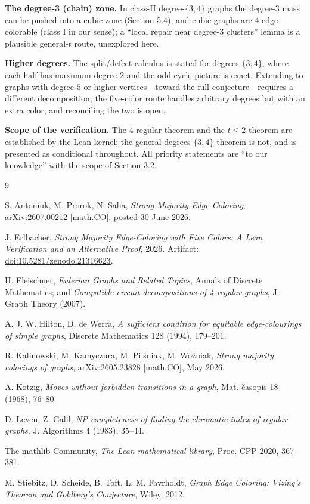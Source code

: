 \documentclass[11pt]{article}
\theoremstyle{definition}
\theoremstyle{remark}
\begin{document}
\textbf{The degree-3 (chain) zone.} In class-II degree-$\{3,4\}$ graphs the degree-3 mass can be pushed into a cubic zone (Section 5.4), and cubic graphs are 4-edge-colorable (class I in our sense); a ``local repair near degree-3 clusters'' lemma is a plausible general-$t$ route, unexplored here.

\textbf{Higher degrees.} The split/defect calculus is stated for degrees $\{3,4\}$, where each half has maximum degree $2$ and the odd-cycle picture is exact. Extending to graphs with degree-$5$ or higher vertices---toward the full conjecture---requires a different decomposition; the five-color route \cite{E5} handles arbitrary degrees but with an extra color, and reconciling the two is open.

\textbf{Scope of the verification.} The 4-regular theorem and the $t \le 2$ theorem are established by the Lean kernel; the general degrees-$\{3,4\}$ theorem is not, and is presented as conditional throughout. All priority statements are ``to our knowledge'' with the scope of Section 3.2.

\begin{thebibliography}{9}

S. Antoniuk, M. Prorok, N. Salia, \emph{Strong Majority Edge-Coloring}, arXiv:2607.00212 [math.CO], posted 30 June 2026.

J. Erlbacher, \emph{Strong Majority Edge-Coloring with Five Colors: A Lean Verification and an Alternative Proof}, 2026. Artifact: \href{https://doi.org/10.5281/zenodo.21316623}{doi:10.5281/zenodo.21316623}.

H. Fleischner, \emph{Eulerian Graphs and Related Topics}, Annals of Discrete Mathematics; and \emph{Compatible circuit decompositions of 4-regular graphs}, J. Graph Theory (2007).

A. J. W. Hilton, D. de Werra, \emph{A sufficient condition for equitable edge-colourings of simple graphs}, Discrete Mathematics 128 (1994), 179--201.

R. Kalinowski, M. Kamyczura, M. Pilśniak, M. Woźniak, \emph{Strong majority colorings of graphs}, arXiv:2605.23828 [math.CO], May 2026.

A. Kotzig, \emph{Moves without forbidden transitions in a graph}, Mat. časopis 18 (1968), 76--80.

D. Leven, Z. Galil, \emph{NP completeness of finding the chromatic index of regular graphs}, J. Algorithms 4 (1983), 35--44.

The mathlib Community, \emph{The Lean mathematical library}, Proc. CPP 2020, 367--381.

M. Stiebitz, D. Scheide, B. Toft, L. M. Favrholdt, \emph{Graph Edge Coloring: Vizing's Theorem and Goldberg's Conjecture}, Wiley, 2012.

\end{thebibliography}
\end{document}
